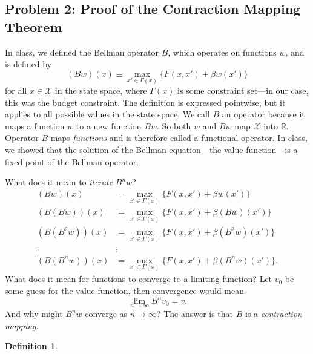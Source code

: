 \documentclass[11pt]{extarticle}
\theoremstyle{plain}
\theoremstyle{definition}
\newtheorem{defn}[thm]{Definition}
\begin{document}
\begin{enumerate}[(a)]
\vspace{5mm}
\section*{Problem 2: Proof of the Contraction Mapping Theorem}

In class, we defined the Bellman operator $B$, which operates on functions $w$, and is defined by
\begin{equation*}
	(Bw)(x) \equiv \max_{x' \in \Gamma(x)} \bigg\{ F(x, x') + \beta w(x') \bigg\}
\end{equation*}
for all $x \in \mathcal X$ in the state space, where $\Gamma(x)$ is some constraint set---in our case, this was the budget constraint. The definition is expressed pointwise, but it applies to all possible values in the state space. We call $B$ an operator because it maps a function $w$ to a new function $Bw$. So both $w$ and $Bw$ map $\mathcal X$ into $\mathbb R$. Operator $B$ maps \textit{functions} and is therefore called a functional operator. In class, we showed that the solution of the Bellman equation---the value function---is a fixed point of the Bellman operator.

What does it mean to \textit{iterate} $B^n w$?
\begin{align*}
	(Bw) (x) &= \max_{x' \in \Gamma(x)} \bigg\{ F(x, x') + \beta w(x') \bigg\} \\
	(B(Bw)) (x) &= \max_{x' \in \Gamma(x)} \bigg\{ F(x, x') + \beta (Bw)(x') \bigg\} \\
	(B(B^2w)) (x) &= \max_{x' \in \Gamma(x)} \bigg\{ F(x, x') + \beta (B^2w)(x') \bigg\} \\
	\vdots & \vdots  \\
	(B(B^nw)) (x) &= \max_{x' \in \Gamma(x)} \bigg\{ F(x, x') + \beta (B^nw)(x') \bigg\}.
\end{align*}
What does it mean for functions to converge to a limiting function? Let $v_0$ be some guess for the value function, then convergence would mean
\begin{equation*}
	\lim_{n \to \infty} B^n v_0 = v.
\end{equation*}
And why might $B^n w$ converge as $n \to \infty$? The answer is that $B$ is a \textit{contraction mapping}.


\vspace{5mm}
\begin{defn}
	

\end{defn}
\end{enumerate}
\end{document}
